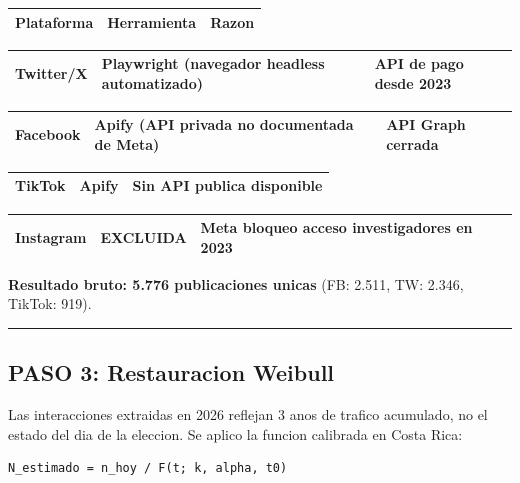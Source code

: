 \documentclass[11pt,a4paper]{article}
\begin{document}
\begin{center}
\begin{tabular}{lll}
\hline
Plataforma & Herramienta & Razon \\
\hline
\end{tabular}
\end{center}
\begin{center}
\begin{tabular}{lll}
\hline
Twitter/X & Playwright (navegador headless automatizado) & API de pago desde 2023 \\
\hline
\end{tabular}
\end{center}
\begin{center}
\begin{tabular}{lll}
\hline
Facebook & Apify (API privada no documentada de Meta) & API Graph cerrada \\
\hline
\end{tabular}
\end{center}
\begin{center}
\begin{tabular}{lll}
\hline
TikTok & Apify & Sin API publica disponible \\
\hline
\end{tabular}
\end{center}
\begin{center}
\begin{tabular}{lll}
\hline
Instagram & EXCLUIDA & Meta bloqueo acceso investigadores en 2023 \\
\hline
\end{tabular}
\end{center}

\textbf{Resultado bruto: 5.776 publicaciones unicas} (FB: 2.511, TW: 2.346, TikTok: 919).\\[2pt]

\vspace{4pt}\noindent\rule{\linewidth}{0.4pt}\vspace{4pt}

\subsection{PASO 3: Restauracion Weibull}

Las interacciones extraidas en 2026 reflejan 3 anos de trafico acumulado, no el estado del dia de la eleccion. Se aplico la funcion calibrada en Costa Rica:\\[2pt]

\begin{lstlisting}
N_estimado = n_hoy / F(t; k, alpha, t0)
\end{lstlisting}
\end{document}
